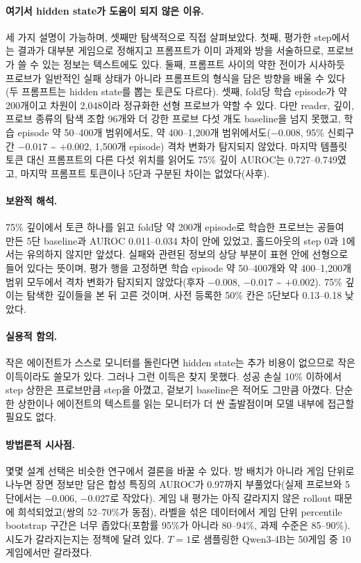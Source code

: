 \documentclass[10pt]{article}
\begin{document}
\paragraph{여기서 hidden state가 도움이 되지 않은 이유.} 세 가지 설명이 가능하며, 셋째만 탐색적으로 직접 살펴보았다. 첫째, 평가한 step에서는 결과가 대부분 게임으로 정해지고 프롬프트가 이미 과제와 방을 서술하므로, 프로브가 쓸 수 있는 정보는 텍스트에도 있다.
둘째, 프롬프트 사이의 약한 전이가 시사하듯 프로브가 일반적인 실패 상태가 아니라 프롬프트의 형식을 담은 방향을 배울 수 있다(두 프롬프트는 hidden state를 뽑는 토큰도 다르다).
셋째, fold당 학습 episode가 약 200개이고 차원이 2,048이라 정규화한 선형 프로브가 약할 수 있다. 다만 reader, 깊이, 프로브 종류의 탐색 조합 96개와 더 강한 프로브 다섯 개도 baseline을 넘지 못했고, 학습 episode 약 50--400개 범위에서도, 약 400--1,200개 범위에서도($-0.008$, 95\% 신뢰구간 $-0.017$ \textasciitilde{} $+0.002$, 1,500개 episode) 격차 변화가 탐지되지 않았다. 마지막 템플릿 토큰 대신 프롬프트의 다른 다섯 위치를 읽어도 75\% 깊이 AUROC는 0.727--0.749였고, 마지막 프롬프트 토큰이나 5단과 구분된 차이는 없었다(사후).

\paragraph{보완적 해석.} 75\% 깊이에서 토큰 하나를 읽고 fold당 약 200개 episode로 학습한 프로브는 공들여 만든 5단 baseline과 AUROC 0.011--0.034 차이 안에 있었고, 홀드아웃의 step 0과 1에서는 유의하지 않지만 앞섰다. 실패와 관련된 정보의 상당 부분이 표현 안에 선형으로 들어 있다는 뜻이며, 평가 행을 고정하면 학습 episode 약 50--400개와 약 400--1,200개 범위 모두에서 격차 변화가 탐지되지 않았다(후자 $-0.008$, $-0.017$ \textasciitilde{} $+0.002$). 75\% 깊이는 탐색한 깊이들을 본 뒤 고른 것이며, 사전 등록한 50\% 칸은 5단보다 0.13--0.18 낮았다.

\paragraph{실용적 함의.} 작은 에이전트가 스스로 모니터를 돌린다면 hidden state는 추가 비용이 없으므로 작은 이득이라도 쓸모가 있다. 그러나 그런 이득은 찾지 못했다. 성공 손실 10\% 이하에서 step 상한은 프로브만큼 step을 아꼈고, 겉보기 baseline은 적어도 그만큼 아꼈다.
단순한 상한이나 에이전트의 텍스트를 읽는 모니터가 더 싼 출발점이며 모델 내부에 접근할 필요도 없다.

\paragraph{방법론적 시사점.} 몇몇 설계 선택은 비슷한 연구에서 결론을 바꿀 수 있다. 방 배치가 아니라 게임 단위로 나누면 장면 정보만 담은 합성 특징의 AUROC가 0.97까지 부풀었다(실제 프로브와 5단에서는 $-0.006$, $-0.027$로 작았다).
게임 내 평가는 아직 갈라지지 않은 rollout 때문에 희석되었고(쌍의 52--70\%가 동점), 라벨을 섞은 데이터에서 게임 단위 percentile bootstrap 구간은 너무 좁았다(포함률 95\%가 아니라 80--94\%, 과제 수준은 85--90\%).
시도가 갈라지는지는 정책에 달려 있다. $T = 1$로 샘플링한 Qwen3-4B는 50게임 중 10게임에서만 갈라졌다.
\end{document}
